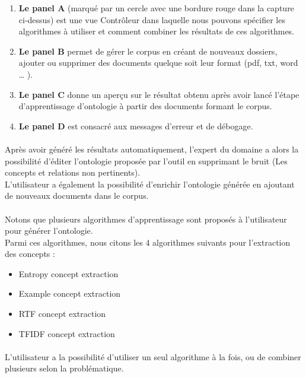 \documentclass[12pt, a4paper, oneside]{book}
\begin{document}
\begin{enumerate}
\item \textbf{Le panel A} (marqué par un cercle avec une bordure rouge dans la capture ci-dessus) est une vue Contrôleur dans laquelle nous pouvons spécifier les algorithmes à utiliser et comment combiner les résultats de ces algorithmes.

\item \textbf{Le panel B} permet de gérer le corpus en créant de nouveaux dossiers, ajouter ou supprimer des documents quelque soit leur format (pdf, txt, word … ).

\item \textbf{Le panel C} donne un aperçu sur le résultat obtenu après avoir lancé l'étape d'apprentissage d'ontologie à partir des documents formant le corpus.

\item \textbf{Le panel D} est consacré aux messages d'erreur et de débogage.

\end{enumerate}
\paragraph{}
Après avoir généré les résultats automatiquement, l'expert du domaine a alors la possibilité d'éditer l'ontologie proposée par l'outil en supprimant le bruit (Les concepts et relations non pertinents).\\ L'utilisateur a également la possibilité d'enrichir l'ontologie générée en ajoutant de nouveaux documents dans le corpus.
\paragraph{}
Notons que plusieurs algorithmes d'apprentissage sont proposés à l'utilisateur pour générer l'ontologie.\\
Parmi ces algorithmes, nous citons les 4 algorithmes suivants pour l'extraction des concepts :\\
\begin{itemize}
\item Entropy concept extraction
\item Example concept extraction
\item RTF concept extraction
\item TFIDF concept extraction

\end{itemize}

\paragraph{}
L'utilisateur a la possibilité d'utiliser un seul algorithme à la fois, ou de combiner plusieurs selon la problématique.
\end{document}
